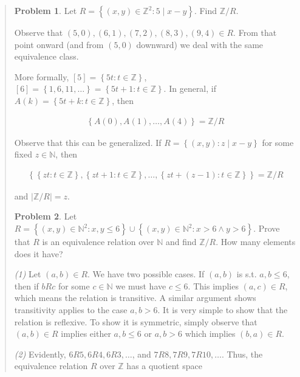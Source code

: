 \documentclass[a4paper, 12pt]{article}
\theoremstyle{definition}
\newtheorem{problem}{Problem}
\theoremstyle{definition}
\theoremstyle{definition}
\begin{document}
\small
\begin{quote}

\begin{problem}
    Let $R = \left\{ (x, y) \in \mathbb{Z}^2 : 5 \mid x - y \right\} $. Find
    $\mathbb{Z} / R$.
\end{problem}

Observe that $(5, 0), (6, 1), (7, 2), (8, 3), (9, 4) \in R$. From that point
onward (and from $(5, 0)$ downward) we deal with the same equivalence class.


More formally,  $[5] = \left\{ 5t : t \in \mathbb{Z} \right\}
$, $[6] = \left\{ 1, 6, 11, \ldots \right\} = \left\{ 5t + 1 : t \in
\mathbb{Z} \right\}  $. In general, if $A(k) = \left\{ 5t + k : t \in \mathbb{Z}
\right\} $, then

\begin{align*}
    \left\{ A(0), A(1), \ldots, A(4) \right\} = \mathbb{Z} / R
\end{align*}

Observe that this can be generalized. If $R = \left\{ (x, y) : z \mid x - y
\right\} $ for some fixed $z \in \mathbb{N}$, then 

\begin{align*}
    \left\{  \left\{ zt : t \in \mathbb{Z} \right\}, \left\{ zt+1 : t \in
    \mathbb{Z} \right\}, \ldots, \left\{ zt + ( z-1 ) : t \in \mathbb{Z} \right\}
\right\}  = \mathbb{Z}/R
\end{align*}

and $|\mathbb{Z}/R| = z$.

\begin{problem}
    Let $R = \left\{ (x, y) \in \mathbb{N}^2 : x, y \leq 6 \right\}  \cup
    \left\{ (x, y) \in \mathbb{N}^2 : x > 6 \land  y > 6 \right\} $. Prove that
    $R$ is an equivalence relation over $\mathbb{N}$ and find $\mathbb{Z} / R$.
    How many elements does it have?
\end{problem}

\textit{(1)} Let $(a, b) \in R$. We have two possible cases. If $(a, b)$ is s.t.
$a, b \leq 6$, then if $b R c$ for some $c \in \mathbb{N}$ we must have $c
\leq 6$. This implies $(a, c) \in R$, which means the relation is transitive. A
similar argument shows transitivity applies to the case $a, b > 6$. It is very
simple to show that the relation is reflexive. To show it is symmetric, simply
observe that $(a, b) \in  R$ implies either $a, b \leq 6$ or $a, b > 6$ which
implies $(b, a) \in  R$.

\textit{(2)} Evidently, $6R 5, 6R 4, 6R 3,\ldots $, and $7 R 8, 7R 9, 7R 10,
\ldots$. Thus, the equivalence relation $R$ over $\mathbb{Z}$ has a quotient space


\end{quote}
\end{document}
